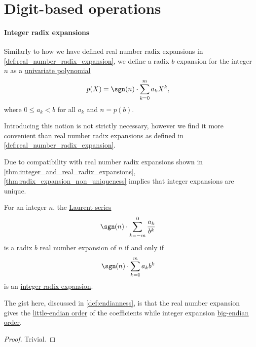 \section{Digit-based operations}\label{sec:digit_based_operations}

\paragraph{Integer radix expansions}

\begin{definition}\label{def:integer_radix_expansion}
  Similarly to how we have defined real number radix expansions in \cref{def:real_number_radix_expansion}, we define a radix \( b \) expansion for the integer \( n \) as a \hyperref[def:univariate_polynomial]{univariate polynomial}
  \begin{equation*}
    p(X) = \sgn(n) \cdot \sum_{k=0}^m a_k X^k,
  \end{equation*}
  where \( 0 \leq a_k < b \) for all \( a_k \) and \( n = p(b) \).
\end{definition}
\begin{comments}
  \item Introducing this notion is not strictly necessary, however we find it more convenient than real number radix expansions as defined in \cref{def:real_number_radix_expansion}.

  \item Due to compatibility with real number radix expansions shown in \cref{thm:integer_and_real_radix_expansions}, \cref{thm:radix_expansion_non_uniqueness} implies that integer expansions are unique.
\end{comments}

\begin{proposition}\label{thm:integer_and_real_radix_expansions}
  For an integer \( n \), the \hyperref[def:formal_laurent_series]{Laurent series}
  \begin{equation}\label{eq:thm:integer_and_real_radix_expansions/series}
    \sgn(n) \cdot \sum_{k=-m}^0 \frac {a_k} {b^k}
  \end{equation}
  is a radix \( b \) \hyperref[def:real_number_radix_expansion]{real number expansion} of \( n \) if and only if
  \begin{equation}\label{eq:thm:integer_and_real_radix_expansions/polynomial}
    \sgn(n) \cdot \sum_{k=0}^m a_k b^k
  \end{equation}
  is an \hyperref[def:integer_radix_expansion]{integer radix expansion}.
\end{proposition}
\begin{comments}
  \item The gist here, discussed in \cref{def:endianness}, is that the real number expansion gives the \hyperref[def:endianness]{little-endian order} of the coefficients while integer expansion \hyperref[def:endianness]{big-endian order}.
\end{comments}
\begin{proof}
  Trivial.
\end{proof}

